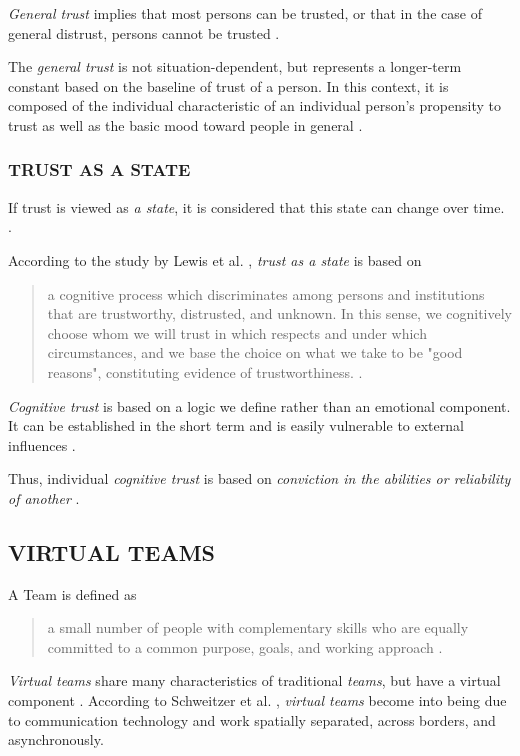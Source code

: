 \documentclass[sigchi]{acmart}
\begin{document}
\textit{General trust} implies that most persons can be trusted, or that in the case of general distrust, persons cannot be trusted \citep[p. 409]{stolle2002trusting}.

The \textit{general trust} is not situation-dependent, but represents a longer-term constant based on the baseline of trust of a person. In this context, it is composed of the individual characteristic of an individual person's propensity to trust as well as the basic mood toward people in general \citep[p. 11]{couch1996assessment}.

\subsubsection{TRUST AS A STATE}
If trust is viewed as \textit{a state}, it is considered that this state can change over time. \citep[p. 712]{mayer1995integrative}.

According to the study by Lewis et al. \citep[pp. 970-971]{lewis1985trust}, \textit{trust as a state} is based on
\begin{quote} \grqq{}a cognitive process which discriminates among persons and institutions that are trustworthy, distrusted, and unknown. In this sense, we cognitively choose whom we will trust in which respects and under which circumstances, and we base the choice on what we take to be "good reasons", constituting evidence of trustworthiness.\grqq{} \citep[p. 970]{lewis1985trust}.\end{quote}

\textit{Cognitive trust} is based on a logic we define rather than an emotional component. It can be established in the short term and is easily vulnerable to external influences \citep[p. 970]{lewis1985trust}. 

Thus, individual \textit{cognitive trust} is based on \textit{conviction in the abilities or reliability of another} \citep[p. 30]{mcallister1995affect}.

\subsection{VIRTUAL TEAMS}
A Team is defined as \begin{quote}\grqq{}a small number of people with complementary skills who are equally committed to a common purpose, goals, and working approach\grqq{} \citep[p. 2]{zenun2007effects}. \end{quote}

\textit{Virtual teams} share many characteristics of traditional \textit{teams}, but have a virtual component \citep[p. 270]{schweitzer2010conceptualizing}.
According to Schweitzer et al. \citep[p. 270]{schweitzer2010conceptualizing}, \textit{virtual teams} become into being due to communication technology and work spatially separated, across borders, and asynchronously.
\end{document}
